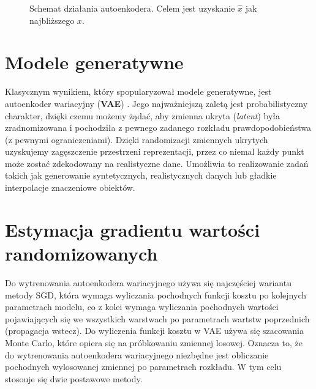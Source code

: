 \documentclass{iithesis}
\begin{document}
\begin{figure}[b]
    \caption{\label{fig:ae_basics} Schemat działania autoenkodera. Celem jest uzyskanie $\hat{x}$
    jak najbliższego $x$.}
\end{figure}

\section{Modele generatywne}
Klasycznym wynikiem, który spopularyzował modele generatywne, jest autoenkoder wariacyjny
(\textbf{VAE}) \cite{vae}. Jego najważniejszą zaletą jest probabilistyczny charakter,
dzięki czemu możemy żądać, aby zmienna ukryta (\textit{latent}) była zradnomizowana i pochodziła
z pewnego zadanego rozkładu prawdopodobieństwa (z pewnymi ograniczeniami).
Dzięki randomizacji zmiennych ukrytych uzyskujemy zagęszczenie przestrzeni reprezentacji,
przez co niemal każdy punkt może zostać zdekodowany na realistyczne dane.
Umożliwia to realizowanie zadań takich jak generowanie syntetycznych,
realistycznych danych lub gładkie interpolacje znaczeniowe obiektów.

\section{Estymacja gradientu wartości randomizowanych}
Do wytrenowania autoenkodera wariacyjnego używa się najczęściej wariantu metody SGD, która
wymaga wyliczania pochodnych funkcji kosztu po kolejnych parametrach modelu, co z kolei
wymaga wyliczania pochodnych wartości pojawiających się we wszystkich warstwach po parametrach
wartstw poprzednich (propagacja wstecz).
Do wyliczenia funkcji kosztu w VAE używa się szacowania Monte Carlo, które opiera się na
próbkowaniu zmiennej losowej. Oznacza to, że do wytrenowania autoenkodera wariacyjnego
niezbędne jest obliczanie pochodnych wylosowanej zmiennej po parametrach rozkładu.
W tym celu stosouje się dwie postawowe metody.
\end{document}
